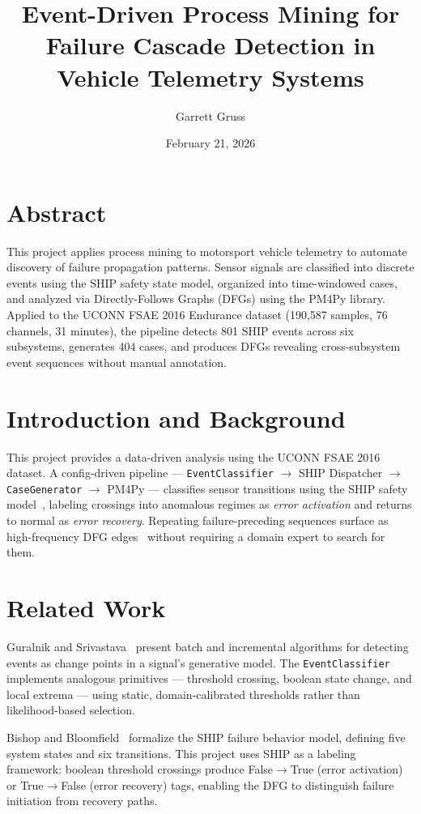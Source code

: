 \documentclass[14pt]{extarticle}
\title{Event-Driven Process Mining for Failure Cascade Detection in Vehicle Telemetry Systems}
\author{Garrett Gruss}
\date{February 21, 2026}
\begin{document}
\maketitle

\section*{Abstract}

This project applies process mining to motorsport vehicle telemetry to automate discovery of failure propagation patterns. Sensor signals are classified into discrete events using the SHIP safety state model, organized into time-windowed cases, and analyzed via Directly-Follows Graphs (DFGs) using the PM4Py library. Applied to the UCONN FSAE 2016 Endurance dataset (190,587 samples, 76 channels, 31 minutes), the pipeline detects 801 SHIP events across six subsystems, generates 404 cases, and produces DFGs revealing cross-subsystem event sequences without manual annotation.

\section{Introduction and Background}

This project provides a data-driven analysis using the UCONN FSAE 2016 dataset. A config-driven pipeline --- \texttt{EventClassifier} $\rightarrow$ SHIP Dispatcher $\rightarrow$ \texttt{CaseGenerator} $\rightarrow$ PM4Py --- classifies sensor transitions using the SHIP safety model~\cite{bishop1995}, labeling crossings into anomalous regimes as \textit{error activation} and returns to normal as \textit{error recovery}. Repeating failure-preceding sequences surface as high-frequency DFG edges~\cite{vanderaalst2004} without requiring a domain expert to search for them.

\section{Related Work}

Guralnik and Srivastava~\cite{guralnik1999} present batch and incremental algorithms for detecting events as change points in a signal's generative model. The \texttt{EventClassifier} implements analogous primitives --- threshold crossing, boolean state change, and local extrema --- using static, domain-calibrated thresholds rather than likelihood-based selection.

Bishop and Bloomfield~\cite{bishop1995} formalize the SHIP failure behavior model, defining five system states and six transitions. This project uses SHIP as a labeling framework: boolean threshold crossings produce False$\rightarrow$True (error activation) or True$\rightarrow$False (error recovery) tags, enabling the DFG to distinguish failure initiation from recovery paths.
\end{document}

